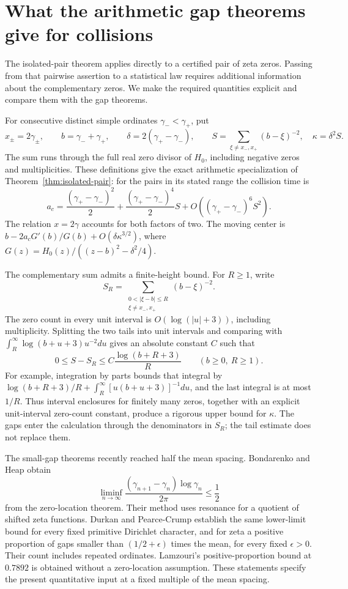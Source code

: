 \section{What the arithmetic gap theorems give for collisions}
\label{sec:arithmetic-collisions}
The isolated-pair theorem applies directly to a certified pair of zeta
zeros. Passing from that pairwise assertion to a statistical law requires
additional information about the complementary zeros. We make the
required quantities explicit and compare them with the gap theorems.

For consecutive distinct simple ordinates $\gamma_-<\gamma_+$, put
\[
 x_\pm=2\gamma_\pm,\qquad b=\gamma_-+\gamma_+,\qquad
 \delta=2(\gamma_+-\gamma_-),\qquad
 S=\sum_{\xi\ne x_-,x_+}(b-\xi)^{-2},\quad\kappa=\delta^2S.
\]
The sum runs through the full real zero divisor of $H_0$, including
negative zeros and multiplicities. These definitions give the exact
arithmetic specialization of Theorem~\ref{thm:isolated-pair}:
for the pairs in its stated range the collision time is
\[
 a_c=\frac{(\gamma_+-\gamma_-)^2}{2}
       +\frac{(\gamma_+-\gamma_-)^4}{2}S
       +O((\gamma_+-\gamma_-)^6S^2).
\]
The relation $x=2\gamma$ accounts for both factors of two. The moving
center is $b-2a_cG'(b)/G(b)+O(\delta\kappa^{3/2})$, where
$G(z)=H_0(z)/((z-b)^2-\delta^2/4)$.

The complementary sum admits a finite-height bound. For $R\ge1$,
write
\[
 S_R=\sum_{\substack{0<|\xi-b|\le R\\\xi\ne x_-,x_+}}(b-\xi)^{-2}.
\]
The zero count in every unit interval is $O(\log(|u|+3))$, including
multiplicity. Splitting the two tails into unit intervals and comparing
with $\int_R^\infty\log(b+u+3)u^{-2}du$ gives an absolute constant
$C$ such that
\begin{equation}\label{eq:pair-exterior-tail}
 0\le S-S_R\le C\frac{\log(b+R+3)}R
 \qquad(b\ge0,\ R\ge1).
\end{equation}
For example, integration by parts bounds that integral by
$\log(b+R+3)/R+\int_R^\infty[u(b+u+3)]^{-1}du$, and the last
integral is at most $1/R$. Thus interval enclosures for finitely many
zeros, together with an explicit unit-interval zero-count constant,
produce a rigorous upper bound for $\kappa$. The gaps enter the
calculation through the denominators in $S_R$; the tail estimate does
not replace them.

The small-gap theorems recently reached half the mean spacing.
Bondarenko and Heap \cite[Theorem~1, p.~1]{bondarenko-heap-half} obtain
\[
 \liminf_{n\to\infty}
       \frac{(\gamma_{n+1}-\gamma_n)\log\gamma_n}{2\pi}\le\frac12
\]
from the zero-location theorem. Their method uses resonance for a
quotient of shifted zeta functions. Durkan and Pearce-Crump
\cite[Theorems~1--2, pp.~1--2]{durkan-pearce-crump} establish the same
lower-limit bound for every fixed primitive Dirichlet character, and
for zeta a positive proportion of gaps smaller than
$(1/2+\epsilon)$ times the mean, for every fixed $\epsilon>0$.
Their count includes repeated ordinates. Lamzouri's
\cite[Theorem~1.1, p.~2]{lamzouri-small-gaps} positive-proportion bound
at $0.7892$ is obtained without a zero-location assumption.
These statements specify the present quantitative input at a fixed
multiple of the mean spacing.

